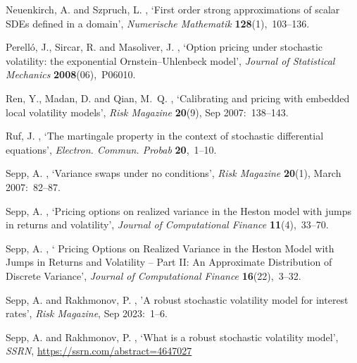 \documentclass[pdftex,11pt,a4paper] {article}
\begin{document}
\begin{thebibliography}{}
Neuenkirch, A. and Szpruch, L.  \harvardyearright
  , `First order strong approximations of scalar SDEs defined in a domain',
  {\em Numerische Mathematik} {\bf 128}(1),~103--136.
  

Perell{\'o}, J., Sircar, R. and Masoliver, J.  \harvardyearright , `Option pricing under stochastic volatility: the
  exponential Ornstein--Uhlenbeck model', {\em Journal of Statistical
  Mechanics} {\bf 2008}(06),~P06010.
	
Ren, Y., Madan, D. and Qian, M.~Q.  \harvardyearright , `Calibrating and pricing with embedded local volatility models', {\em Risk Magazine} {\bf 20}(9), Sep 2007:~138--143.
  
Ruf, J.  \harvardyearright , `The martingale property in the context of stochastic differential equations', {\em Electron. Commun. Probab} {\bf 20},~1--10.

Sepp, A.  \harvardyearright , `Variance swaps under no conditions', {\em Risk Magazine} {\bf 20}(1), March 2007:~82--87.

Sepp, A.  \harvardyearright , `Pricing options on realized
  variance in the Heston model with jumps in returns and volatility', {\em
  Journal of Computational Finance} {\bf 11}(4),~33--70.


Sepp, A.  \harvardyearright , `
Pricing Options on Realized Variance in the Heston Model with Jumps in Returns and Volatility -- Part II: An Approximate Distribution of Discrete Variance', {\em
  Journal of Computational Finance} {\bf 16}(22),~3--32.
	
	
 Sepp, A. and Rakhmonov, P. \harvardyearright, 'A robust stochastic volatility model for interest rates', {\em Risk Magazine}, Sep 2023:~1--6.

 Sepp, A. and Rakhmonov, P. \harvardyearright, `What is a robust stochastic volatility model', {\em SSRN}, \url{https://ssrn.com/abstract=4647027}
	

\end{thebibliography}
\end{document}
